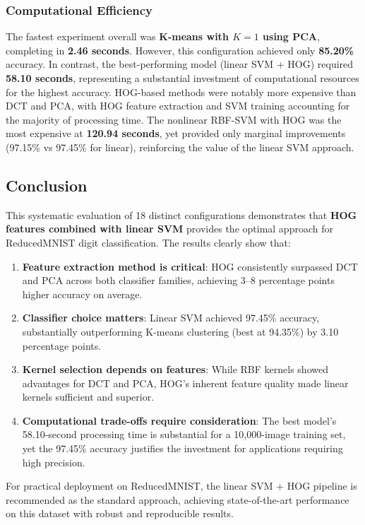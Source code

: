 \subsubsection{Computational Efficiency}

The fastest experiment overall was \textbf{K-means with $K=1$ using PCA}, completing in \textbf{2.46 seconds}. However, this configuration achieved only \textbf{85.20\%} accuracy. In contrast, the best-performing model (linear SVM + HOG) required \textbf{58.10 seconds}, representing a substantial investment of computational resources for the highest accuracy. HOG-based methods were notably more expensive than DCT and PCA, with HOG feature extraction and SVM training accounting for the majority of processing time. The nonlinear RBF-SVM with HOG was the most expensive at \textbf{120.94 seconds}, yet provided only marginal improvements (97.15\% vs 97.45\% for linear), reinforcing the value of the linear SVM approach.

\subsection{Conclusion}

This systematic evaluation of 18 distinct configurations demonstrates that \textbf{HOG features combined with linear SVM} provides the optimal approach for ReducedMNIST digit classification. The results clearly show that:

\begin{enumerate}
    \item \textbf{Feature extraction method is critical}: HOG consistently surpassed DCT and PCA across both classifier families, achieving 3--8 percentage points higher accuracy on average.
    \item \textbf{Classifier choice matters}: Linear SVM achieved 97.45\% accuracy, substantially outperforming K-means clustering (best at 94.35\%) by 3.10 percentage points.
    \item \textbf{Kernel selection depends on features}: While RBF kernels showed advantages for DCT and PCA, HOG's inherent feature quality made linear kernels sufficient and superior.
    \item \textbf{Computational trade-offs require consideration}: The best model's 58.10-second processing time is substantial for a 10,000-image training set, yet the 97.45\% accuracy justifies the investment for applications requiring high precision.
\end{enumerate}

For practical deployment on ReducedMNIST, the linear SVM + HOG pipeline is recommended as the standard approach, achieving state-of-the-art performance on this dataset with robust and reproducible results.